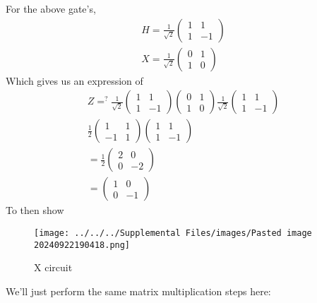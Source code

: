 \documentclass[]{article}
\begin{document}
For the above gate's, \[
\begin{align}
H = \frac{1}{\sqrt{ 2 }}\begin{pmatrix}
1 & 1  \\
1 & -1
\end{pmatrix} \\
X = \frac{1}{\sqrt{ 2 }}\begin{pmatrix}
0 & 1 \\
1 & 0
\end{pmatrix}
\end{align}
\] Which gives us an expression of \[
\begin{align}
Z =^{?} \frac{1}{\sqrt{ 2 }}\begin{pmatrix}
1 & 1  \\
1 & -1
\end{pmatrix}\begin{pmatrix}
0 & 1 \\
1 & 0
\end{pmatrix}\frac{1}{\sqrt{ 2 }}\begin{pmatrix}
1 & 1  \\
1 & -1
\end{pmatrix} \\
\frac{1}{2}\begin{pmatrix}
1 & 1 \\
-1 & 1
\end{pmatrix}\begin{pmatrix}
1 & 1 \\
1 & -1
\end{pmatrix} \\
=\frac{1}{2}\begin{pmatrix}
2 & 0 \\
0 & -2
\end{pmatrix} \\
=\begin{pmatrix}
1 & 0 \\
0 & -1
\end{pmatrix}
\end{align}
\] To then show

\begin{figure}
\centering
\texttt{[image: ../../../Supplemental Files/images/Pasted image 20240922190418.png]}
\caption{X circuit}
\end{figure}

We'll just perform the same matrix multiplication steps here:
\end{document}
